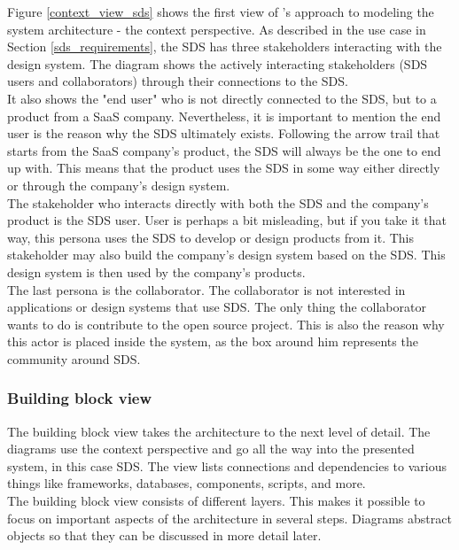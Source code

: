 Figure \ref{context_view_sds} shows the first view of \citeauthor{starke_effektive_2020}'s approach to modeling the system architecture - the context perspective. As described in the use case in Section \ref{sds_requirements}, the \ac{SDS} has three stakeholders interacting with the design system. The diagram shows the actively interacting stakeholders (\ac{SDS} users and collaborators) through their connections to the \ac{SDS}. \\
It also shows the "end user" who is not directly connected to the \ac{SDS}, but to a product from a SaaS company. Nevertheless, it is important to mention the end user is the reason why the \ac{SDS} ultimately exists. Following the arrow trail that starts from the SaaS company's product, the \ac{SDS} will always be the one to end up with. This means that the product uses the \ac{SDS} in some way either directly or through the company's design system. \\
The stakeholder who interacts directly with both the SDS and the company's product is the SDS user. User is perhaps a bit misleading, but if you take it that way, this persona uses the SDS to develop or design products from it. This stakeholder may also build the company's design system based on the SDS. This design system is then used by the company's products.\\
The last persona is the collaborator. The collaborator is not interested in applications or design systems that use SDS. The only thing the collaborator wants to do is contribute to the open source project. This is also the reason why this actor is placed inside the system, as the box around him represents the community around SDS.

\subsubsection{Building block view}
The building block view takes the architecture to the next level of detail. The diagrams use the context perspective and go all the way into the presented system, in this case \ac{SDS}. The view lists connections and dependencies to various things like frameworks, databases, components, scripts, and more. \\
The building block view consists of different layers. This makes it possible to focus on important aspects of the architecture in several steps. Diagrams abstract objects so that they can be discussed in more detail later. \cite{starke_effektive_2020} \\


